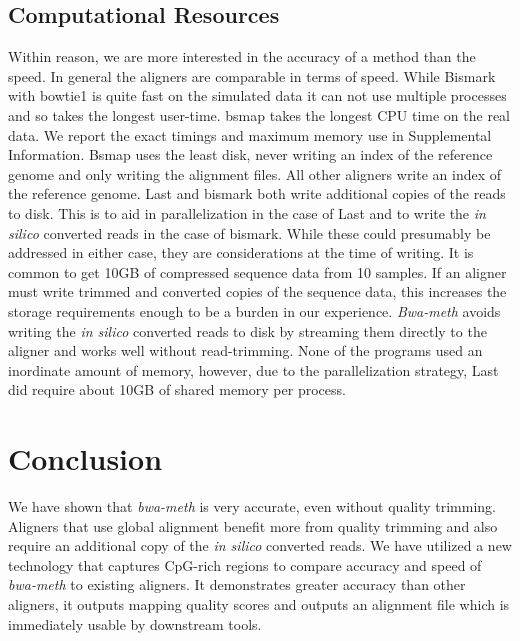 \documentclass{bioinfo}
\begin{document}
\subsection{Computational Resources}
Within reason, we are more interested in the accuracy of a
method than the speed. In general the aligners are comparable in terms of
speed. While Bismark with bowtie1 is quite fast on the simulated data it
can not use multiple processes and so takes the longest user-time. bsmap
takes the longest CPU time on the real data. We report the exact 
timings and maximum memory use in Supplemental Information.
Bsmap uses the least disk, never writing an index of the reference genome
and only writing the alignment files. All other aligners write an index of
the reference genome. Last and bismark both write additional copies of the
reads to disk. This is to aid in parallelization in the case of Last and to
write the \emph{in silico} converted reads in the case of bismark. While
these could presumably be addressed in either case, they are considerations
at the time of writing. It is common to get 10GB of compressed sequence data
from 10 samples. If an aligner must write trimmed and converted copies of the
sequence data, this increases the storage requirements enough to be a
burden in our experience. \textit{Bwa-meth} avoids writing the \emph{in silico}
converted reads to disk by streaming them directly to the aligner and works
well without read-trimming.
None of the programs used an inordinate amount of memory, however, due to
the parallelization strategy, Last did require about 10GB of shared memory
per process.

%
%

\section{Conclusion}
We have shown that \textit{bwa-meth} is very accurate, even without quality
trimming. Aligners that use global alignment benefit more from quality trimming
and also require an additional copy of the \emph{in silico} converted reads.
We have utilized a new technology that captures CpG-rich regions to compare
accuracy and speed of \textit{bwa-meth} to existing aligners.
It demonstrates greater accuracy than other aligners, it outputs mapping quality
scores and outputs an alignment file which is immediately usable by downstream
tools.
\end{document}
